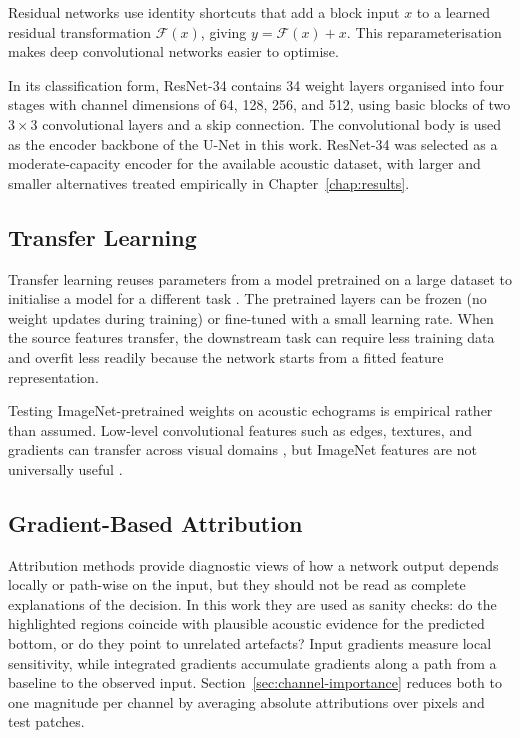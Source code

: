 Residual networks \cite{he_deep_2016} use identity shortcuts that add a block input $x$ to a learned residual transformation $\mathcal{F}(x)$, giving $y=\mathcal{F}(x)+x$. This reparameterisation makes deep convolutional networks easier to optimise.

In its classification form, ResNet-34 \cite{he_deep_2016} contains 34 weight layers organised into four stages with channel dimensions of 64, 128, 256, and 512, using basic blocks of two $3 \times 3$ convolutional layers and a skip connection. The convolutional body is used as the encoder backbone of the U-Net in this work. ResNet-34 was selected as a moderate-capacity encoder for the available acoustic dataset, with larger and smaller alternatives treated empirically in Chapter~\ref{chap:results}.

\subsection{Transfer Learning}
Transfer learning reuses parameters from a model pretrained on a large dataset to initialise a model for a different task \cite{yosinski_how_2014}. The pretrained layers can be frozen (no weight updates during training) or fine-tuned with a small learning rate. When the source features transfer, the downstream task can require less training data and overfit less readily because the network starts from a fitted feature representation.

Testing ImageNet-pretrained weights on acoustic echograms is empirical rather than assumed. Low-level convolutional features such as edges, textures, and gradients can transfer across visual domains \cite{yosinski_how_2014}, but ImageNet features are not universally useful \cite{kornblith_better_2019}.

\subsection{Gradient-Based Attribution}
\label{sec:attribution-theory}

Attribution methods provide diagnostic views of how a network output depends locally or path-wise on the input, but they should not be read as complete explanations of the decision. In this work they are used as sanity checks: do the highlighted regions coincide with plausible acoustic evidence for the predicted bottom, or do they point to unrelated artefacts? Input gradients \cite{simonyan_deep_2014} measure local sensitivity, while integrated gradients \cite{sundararajan_axiomatic_2017} accumulate gradients along a path from a baseline to the observed input. Section~\ref{sec:channel-importance} reduces both to one magnitude per channel by averaging absolute attributions over pixels and test patches.

